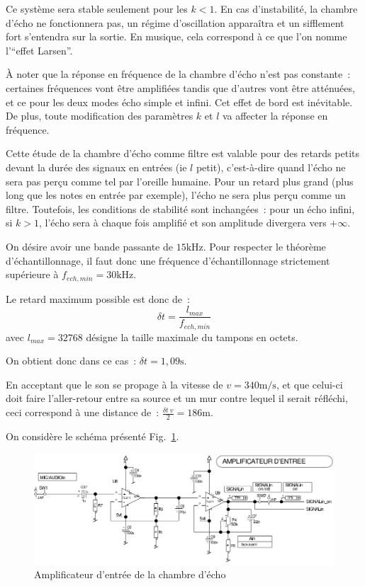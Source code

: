 \documentclass{article}
\begin{document}
Ce système sera stable seulement pour les $k<1$. En cas d'instabilité, la chambre d'écho ne fonctionnera pas, un régime d'oscillation apparaîtra et un sifflement fort s'entendra sur la sortie. En musique, cela correspond à ce que l'on nomme l'``effet Larsen''.

À noter que la réponse en fréquence de la chambre d'écho n'est pas constante~: certaines fréquences vont être amplifiées tandis que d'autres vont être atténuées, et ce pour les deux modes écho simple et infini. Cet effet de bord est inévitable. De plus, toute modification des paramètres $k$ et $l$ va affecter la réponse en fréquence.

Cette étude de la chambre d'écho comme filtre est valable pour des retards petits devant la durée des signaux en entrées (ie $l$ petit), c'est-à-dire quand l'écho ne sera pas perçu comme tel par l'oreille humaine. Pour un retard plus grand (plus long que les notes en entrée par exemple), l'écho ne sera plus perçu comme un filtre. Toutefois, les conditions de stabilité sont inchangées~: pour un écho infini, si $k>1$, l'écho sera à chaque fois amplifié et son amplitude divergera vers $+\infty$. 


On désire avoir une bande passante de $15 \mathrm{kHz}$. Pour respecter le théorème d'échantillonnage, il faut donc une fréquence d'échantillonnage strictement supérieure à $f_{ech,min} = 30 \mathrm{kHz}$.

Le retard maximum possible est donc de~: \begin{equation}
\delta t = \frac{l_{max}}{f_{ech,min}}
\end{equation}
avec $l_{max} = 32768$ désigne la taille maximale du tampons en octets.

On obtient donc dans ce cas~: $\delta t = 1,09 \mathrm{s}$.

En acceptant que le son se propage à la vitesse de $v = 340 \mathrm{m/s}$, et que celui-ci doit faire l'aller-retour entre sa source et un mur contre lequel il serait réfléchi, ceci correspond à une distance de~: $\frac{\delta t~v}{2} = 186\mathrm{m}$.


On considère le schéma présenté Fig.~\ref{fig:ampl}.

\begin{figure}[h]
	\centering
	\includegraphics[width=.8\textwidth]{shema_echo_entree.png}
	\caption{Amplificateur d'entrée de la chambre d'écho}
	\label{fig:ampl}
\end{figure}
\end{document}
